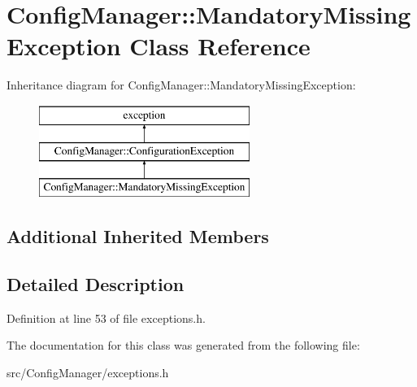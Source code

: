 \hypertarget{class_config_manager_1_1_mandatory_missing_exception}{}\section{Config\+Manager\+:\+:Mandatory\+Missing\+Exception Class Reference}
\label{class_config_manager_1_1_mandatory_missing_exception}
Inheritance diagram for Config\+Manager\+:\+:Mandatory\+Missing\+Exception\+:\begin{figure}[H]
\begin{center}
\leavevmode
\includegraphics[height=3.000000cm]{class_config_manager_1_1_mandatory_missing_exception}
\end{center}
\end{figure}
\subsection*{Additional Inherited Members}


\subsection{Detailed Description}


Definition at line 53 of file exceptions.\+h.



The documentation for this class was generated from the following file\+:\begin{DoxyCompactItemize}
\item 
src/\+Config\+Manager/exceptions.\+h\end{DoxyCompactItemize}
